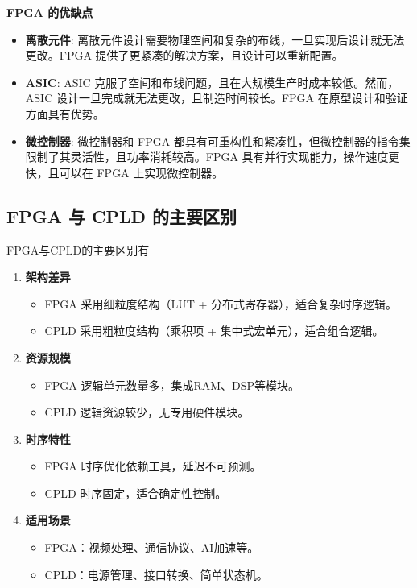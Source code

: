 \begin{frame}{\textbf{FPGA 的优缺点}}
\begin{itemize}
\tightlist
\item
    \textbf{离散元件}:
    离散元件设计需要物理空间和复杂的布线，一旦实现后设计就无法更改。FPGA
    提供了更紧凑的解决方案，且设计可以重新配置。
\item
    \textbf{ASIC}: ASIC
    克服了空间和布线问题，且在大规模生产时成本较低。然而，ASIC
    设计一旦完成就无法更改，且制造时间较长。FPGA
    在原型设计和验证方面具有优势。
\item
    \textbf{微控制器}: 微控制器和 FPGA
    都具有可重构性和紧凑性，但微控制器的指令集限制了其灵活性，且功率消耗较高。FPGA
    具有并行实现能力，操作速度更快，且可以在 FPGA 上实现微控制器。
\end{itemize}
\end{frame}

\subsection{FPGA 与 CPLD 的主要区别}
\begin{frame}{FPGA与CPLD的主要区别有}
\begin{enumerate}
\tightlist
\item
    \textbf{架构差异}

    \begin{itemize}
    \tightlist
    \item
    FPGA 采用细粒度结构（LUT + 分布式寄存器），适合复杂时序逻辑。\\
    \item
    CPLD 采用粗粒度结构（乘积项 + 集中式宏单元），适合组合逻辑。
    \end{itemize}
\item
    \textbf{资源规模}

    \begin{itemize}
    \tightlist
    \item
    FPGA 逻辑单元数量多，集成RAM、DSP等模块。\\
    \item
    CPLD 逻辑资源较少，无专用硬件模块。
    \end{itemize}
\item
    \textbf{时序特性}

    \begin{itemize}
    \tightlist
    \item
    FPGA 时序优化依赖工具，延迟不可预测。\\
    \item
    CPLD 时序固定，适合确定性控制。
    \end{itemize}
\item
    \textbf{适用场景}

    \begin{itemize}
    \tightlist
    \item
    FPGA：视频处理、通信协议、AI加速等。\\
    \item
    CPLD：电源管理、接口转换、简单状态机。
    \end{itemize}
\end{enumerate}
\end{frame}

